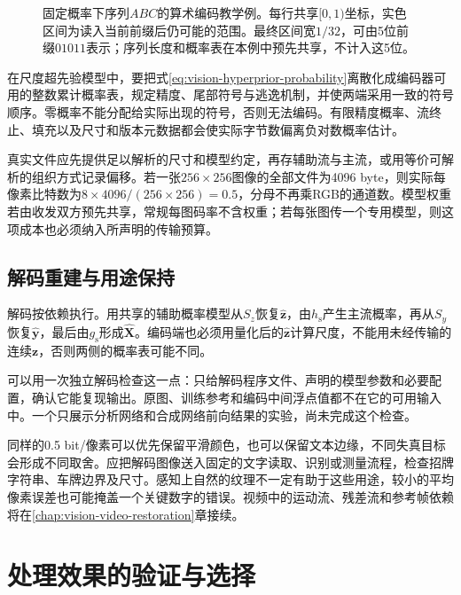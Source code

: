 \begin{figure}[htbp]
 \centering
 
 \caption{固定概率下序列$ABC$的算术编码教学例。每行共享$[0,1)$坐标，实色区间为读入当前前缀后仍可能的范围。最终区间宽$1/32$，可由5位前缀$01011$表示；序列长度和概率表在本例中预先共享，不计入这5位。}
 \label{fig:vision-arithmetic-coding}
\end{figure}

在尺度超先验模型中，要把式\eqref{eq:vision-hyperprior-probability}离散化成编码器可用的整数累计概率表，规定精度、尾部符号与逃逸机制，并使两端采用一致的符号顺序。零概率不能分配给实际出现的符号，否则无法编码。有限精度概率、流终止、填充以及尺寸和版本元数据都会使实际字节数偏离负对数概率估计。

真实文件应先提供足以解析的尺寸和模型约定，再存辅助流与主流，或用等价可解析的组织方式记录偏移。若一张$256\times256$图像的全部文件为4096 byte，则实际每像素比特数为$8\times4096/(256\times256)=0.5$，分母不再乘RGB的通道数。模型权重若由收发双方预先共享，常规每图码率不含权重；若每张图传一个专用模型，则这项成本也必须纳入所声明的传输预算。

\subsection{解码重建与用途保持}
\label{sec:vision-restoration-decoding}

解码按依赖执行。用共享的辅助概率模型从$S_z$恢复$\hat{\bm{z}}$，由$h_{\mathrm{s}}$产生主流概率，再从$S_y$恢复$\hat{\bm{y}}$，最后由$g_{\mathrm{s}}$形成$\widehat{\bm{X}}$。编码端也必须用量化后的$\hat{\bm{z}}$计算尺度，不能用未经传输的连续$\bm{z}$，否则两侧的概率表可能不同。

可以用一次独立解码检查这一点：只给解码程序文件、声明的模型参数和必要配置，确认它能复现输出。原图、训练参考和编码中间浮点值都不在它的可用输入中。一个只展示分析网络和合成网络前向结果的实验，尚未完成这个检查。

同样的0.5 bit/像素可以优先保留平滑颜色，也可以保留文本边缘，不同失真目标会形成不同取舍。应把解码图像送入固定的文字读取、识别或测量流程，检查招牌字符串、车牌边界及尺寸。感知上自然的纹理不一定有助于这些用途，较小的平均像素误差也可能掩盖一个关键数字的错误。视频中的运动流、残差流和参考帧依赖将在\ref{chap:vision-video-restoration}章接续。

\section{处理效果的验证与选择}
\label{sec:vision-restoration-evaluation}

